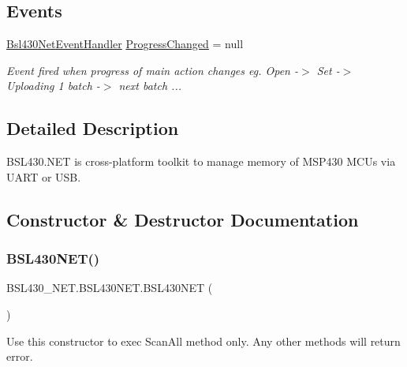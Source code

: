 \subsection*{Events}
\begin{DoxyCompactItemize}
\item 
\mbox{\hyperlink{namespace_b_s_l430___n_e_t_a98dbd2acd09405042ee92547353c9f81}{Bsl430\+Net\+Event\+Handler}} \mbox{\hyperlink{class_b_s_l430___n_e_t_1_1_b_s_l430_n_e_t_aab78a2fd8dcb209a9e5caf001f992ef3}{Progress\+Changed}} = null
\begin{DoxyCompactList}\small\item\em Event fired when progress of main action changes eg. Open -\/$>$ Set -\/$>$ Uploading 1 batch -\/$>$ next batch ... \end{DoxyCompactList}\end{DoxyCompactItemize}


\subsection{Detailed Description}
B\+S\+L430.\+N\+ET is cross-\/platform toolkit to manage memory of M\+S\+P430 M\+C\+Us via U\+A\+RT or U\+SB. 



\subsection{Constructor \& Destructor Documentation}
\mbox{\label{class_b_s_l430___n_e_t_1_1_b_s_l430_n_e_t_a03891e66951daf350f41fe53a176e4fd}} 
\subsubsection{\texorpdfstring{BSL430NET()}{BSL430NET()}\hspace{0.1cm}{\footnotesize\ttfamily [1/4]}}
{\footnotesize\ttfamily B\+S\+L430\+\_\+\+N\+E\+T.\+B\+S\+L430\+N\+E\+T.\+B\+S\+L430\+N\+ET (\begin{DoxyParamCaption}{ }\end{DoxyParamCaption})}



Use this constructor to exec Scan\+All method only. Any other methods will return error. 

